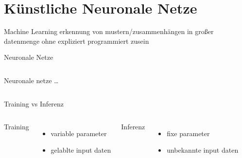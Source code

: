 \section[\thesection \  Künstliche Neuronale Netze]{Künstliche Neuronale Netze}\label{sec:nn}

\begin{frame}{Machine Learning}
    \vspace{0.5cm}
        erkennung von mustern/zusammenhängen in großer 
        datenmenge ohne expliziert programmiert zusein
        \begin{figure}[h]
            \centering
            \def\svgwidth{0.8\columnwidth}
            \tiny
            
        \end{figure}

    \begin{block}{Neuronale Netze}
        \begin{columns}[T]
            Neuronale netze \dots
            \begin{figure}[htb]
                \centering
                \tiny
                
            \end{figure}         
        \end{columns}
    \end{block}    
\end{frame}



\begin{frame}{Training vs Inferenz}
    \begin{columns}[T]
        Training
        \begin{itemize}
            \item variable parameter
            \item gelablte input daten
        \end{itemize}
        Inferenz
        \begin{itemize}
            \item fixe parameter
            \item unbekannte input daten
        \end{itemize}
    \end{columns}
\end{frame}


